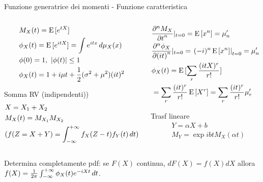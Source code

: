 \begin{frame}{Funzione generatrice dei momenti - Funzione caratteristica}
\begin{columns}[T]
	\begin{column}{0.5\textwidth}
		\begin{align*}
		&M_X(t)=\E{[\exp{tX}]}\\
		&\phi_X(t)=\E{[\exp{itX}]}=\int\exp{itx}\,d\mu_X(x)\\
		&\phi(0)=1,\ |\phi(t)|\leq1\\
		&\phi_X(t)=1+i\mu t+\frac{1}{2}(\sigma^2+\mu^2)(it)^2
		\end{align*}
		\begin{block}{Somma RV (indipendenti))}
			\begin{align*}
			&X=X_1+X_2\\
			&M_X(t)=M_{X_1}M_{X_2}\\
			&(f(Z=X+Y)=\intsinf{}f_X(Z-t)f_Y(t)\,dt)
			\end{align*}
		\end{block}
	\end{column}
	\begin{column}{0.5\textwidth}
		\begin{align*}
		&\PDyn{t}{M_X}{n}|_{t=0}=\E{[x^n]}=\mu_n'\\
		&\PDyn{(it)}{\phi_X}{n}|_{t=0}=\left.(-i)^n\E{[x^n]}\right|_{t=0}=\mu_n'\\
		&\phi_X(t)=\E{[\sum_r\frac{(itX)^r}{r!}]}\\
		&=\sum_r\frac{(it)^r}{r!}\E{[X^r]}=\sum_r\frac{(it)^r}{r!}\mu_r'
		\end{align*}
		\begin{block}{Trasf lineare}
			\begin{align*}
			&Y=\alpha X+b\\
			&M_Y=\exp{ibt}M_X(\alpha t)
			\end{align*}
		\end{block}
	\end{column}
\end{columns}
Determina completamente pdf: se $F(X)$ continua, $dF(X)=f(X)dX$ allora $f(X)=\frac{1}{2\pi}\intsinf{}\phi_X(t)\exp{-iXt}\,dt$.
\end{frame}

